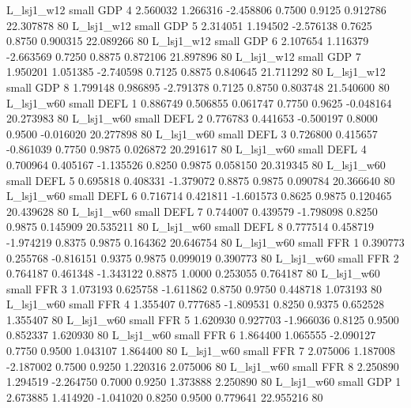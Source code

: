     L_lsj1_w12      small      GDP                 4 2.560032 1.266316 -2.458806 0.7500 0.9125  0.912786   22.307878 80
    L_lsj1_w12      small      GDP                 5 2.314051 1.194502 -2.576138 0.7625 0.8750  0.900315   22.089266 80
    L_lsj1_w12      small      GDP                 6 2.107654 1.116379 -2.663569 0.7250 0.8875  0.872106   21.897896 80
    L_lsj1_w12      small      GDP                 7 1.950201 1.051385 -2.740598 0.7125 0.8875  0.840645   21.711292 80
    L_lsj1_w12      small      GDP                 8 1.799148 0.986895 -2.791378 0.7125 0.8750  0.803748   21.540600 80
    L_lsj1_w60      small     DEFL                 1 0.886749 0.506855  0.061747 0.7750 0.9625 -0.048164   20.273983 80
    L_lsj1_w60      small     DEFL                 2 0.776783 0.441653 -0.500197 0.8000 0.9500 -0.016020   20.277898 80
    L_lsj1_w60      small     DEFL                 3 0.726800 0.415657 -0.861039 0.7750 0.9875  0.026872   20.291617 80
    L_lsj1_w60      small     DEFL                 4 0.700964 0.405167 -1.135526 0.8250 0.9875  0.058150   20.319345 80
    L_lsj1_w60      small     DEFL                 5 0.695818 0.408331 -1.379072 0.8875 0.9875  0.090784   20.366640 80
    L_lsj1_w60      small     DEFL                 6 0.716714 0.421811 -1.601573 0.8625 0.9875  0.120465   20.439628 80
    L_lsj1_w60      small     DEFL                 7 0.744007 0.439579 -1.798098 0.8250 0.9875  0.145909   20.535211 80
    L_lsj1_w60      small     DEFL                 8 0.777514 0.458719 -1.974219 0.8375 0.9875  0.164362   20.646754 80
    L_lsj1_w60      small      FFR                 1 0.390773 0.255768 -0.816151 0.9375 0.9875  0.099019    0.390773 80
    L_lsj1_w60      small      FFR                 2 0.764187 0.461348 -1.343122 0.8875 1.0000  0.253055    0.764187 80
    L_lsj1_w60      small      FFR                 3 1.073193 0.625758 -1.611862 0.8750 0.9750  0.448718    1.073193 80
    L_lsj1_w60      small      FFR                 4 1.355407 0.777685 -1.809531 0.8250 0.9375  0.652528    1.355407 80
    L_lsj1_w60      small      FFR                 5 1.620930 0.927703 -1.966036 0.8125 0.9500  0.852337    1.620930 80
    L_lsj1_w60      small      FFR                 6 1.864400 1.065555 -2.090127 0.7750 0.9500  1.043107    1.864400 80
    L_lsj1_w60      small      FFR                 7 2.075006 1.187008 -2.187002 0.7500 0.9250  1.220316    2.075006 80
    L_lsj1_w60      small      FFR                 8 2.250890 1.294519 -2.264750 0.7000 0.9250  1.373888    2.250890 80
    L_lsj1_w60      small      GDP                 1 2.673885 1.414920 -1.041020 0.8250 0.9500  0.779641   22.955216 80
